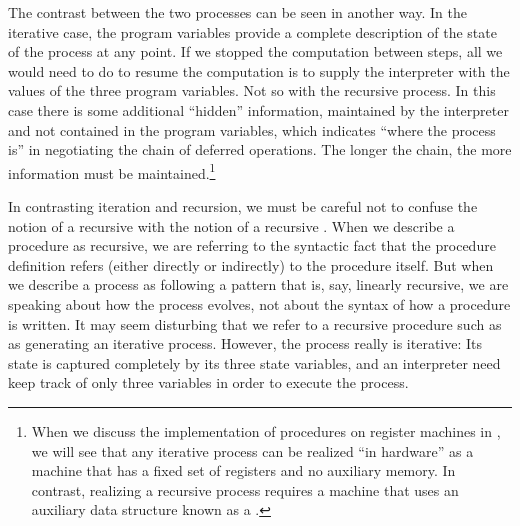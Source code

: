 The contrast between the two processes can be seen in another way.  In the
iterative case, the program variables provide a complete description of the
state of the process at any point.  If we stopped the computation between
steps, all we would need to do to resume the computation is to supply the
interpreter with the values of the three program variables.  Not so with the
recursive process.  In this case there is some additional ``hidden''
information, maintained by the interpreter and not contained in the program
variables, which indicates ``where the process is'' in negotiating the chain of
deferred operations.  The longer the chain, the more information must be
maintained.\footnote{When we discuss the implementation of procedures on
register machines in , we will see that any iterative process
can be realized ``in hardware'' as a machine that has a fixed set of registers
and no auxiliary memory.  In contrast, realizing a recursive process requires a
machine that uses an auxiliary data structure known as a .}

In contrasting iteration and recursion, we must be careful not to confuse the
notion of a recursive  with the notion of a recursive
.  When we describe a procedure as recursive, we are
referring to the syntactic fact that the procedure definition refers (either
directly or indirectly) to the procedure itself.  But when we describe a
process as following a pattern that is, say, linearly recursive, we are
speaking about how the process evolves, not about the syntax of how a procedure
is written.  It may seem disturbing that we refer to a recursive procedure such
as  as generating an iterative process.  However, the process
really is iterative: Its state is captured completely by its three state
variables, and an interpreter need keep track of only three variables in order
to execute the process.

\enlargethispage{\baselineskip}

